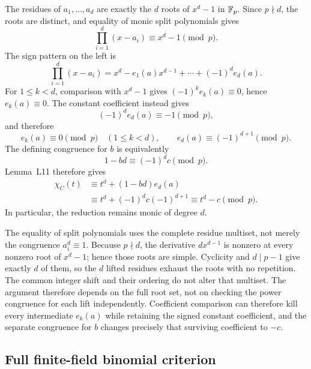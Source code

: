 \documentclass[11pt,letterpaper]{article}
\theoremstyle{plain}
\begin{document}
The residues of $a_1,\ldots,a_d$ are exactly the $d$ roots of $x^d-1$ in $\mathbb{F}_{p}$.  Since $p\nmid d$, the roots are distinct, and equality of monic split polynomials gives
\[
\prod_{i=1}^d(x-a_i)\equiv x^d-1\pmod p.
\]
The sign pattern on the left is
\[
\prod_{i=1}^d(x-a_i)
=x^d-e_1(a)x^{d-1}+\cdots+(-1)^de_d(a).
\]
For $1\leq k<d$, comparison with $x^d-1$ gives $(-1)^ke_k(a)\equiv0$, hence $e_k(a)\equiv0$.  The constant coefficient instead gives
\[
(-1)^de_d(a)\equiv-1\pmod p,
\]
and therefore
\[
e_k(a)\equiv0\pmod p\quad(1\leq k<d),
\qquad e_d(a)\equiv(-1)^{d+1}\pmod p.
\]
The defining congruence for $b$ is equivalently
\[
1-bd\equiv(-1)^dc\pmod p.
\]
Lemma~L11 therefore gives
\begin{align*}
\chi_C(t)
&\equiv t^d+(1-bd)e_d(a)\\
&\equiv t^d+(-1)^dc(-1)^{d+1}
\equiv t^d-c\pmod p.
\end{align*}
In particular, the reduction remains monic of degree $d$.

The equality of split polynomials uses the complete residue multiset, not merely the congruence \(a_i^d\equiv1\).  Because \(p\nmid d\), the derivative \(d x^{d-1}\) is nonzero at every nonzero root of \(x^d-1\); hence those roots are simple.  Cyclicity and \(d\mid p-1\) give exactly \(d\) of them, so the \(d\) lifted residues exhaust the roots with no repetition.  The common integer shift and their ordering do not alter that multiset.  The argument therefore depends on the full root set, not on checking the power congruence for each lift independently.  Coefficient comparison can therefore kill every intermediate \(e_k(a)\) while retaining the signed constant coefficient, and the separate congruence for \(b\) changes precisely that surviving coefficient to \(-c\).

\subsection{Full finite-field binomial criterion}
\end{document}
